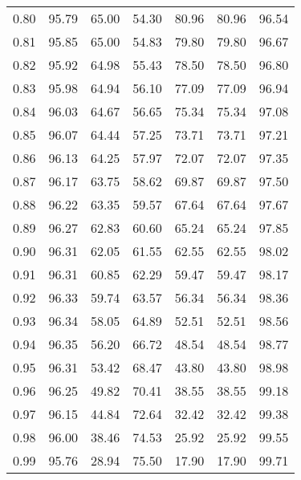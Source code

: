 \begin{tabular}{|c|c|c|c|c|c|c|}
      0.80 &     95.79 &     65.00 &      54.30 &   80.96 &      80.96 &         96.54 \\
      0.81 &     95.85 &     65.00 &      54.83 &   79.80 &      79.80 &         96.67 \\
      0.82 &     95.92 &     64.98 &      55.43 &   78.50 &      78.50 &         96.80 \\
      0.83 &     95.98 &     64.94 &      56.10 &   77.09 &      77.09 &         96.94 \\
      0.84 &     96.03 &     64.67 &      56.65 &   75.34 &      75.34 &         97.08 \\
      0.85 &     96.07 &     64.44 &      57.25 &   73.71 &      73.71 &         97.21 \\
      0.86 &     96.13 &     64.25 &      57.97 &   72.07 &      72.07 &         97.35 \\
      0.87 &     96.17 &     63.75 &      58.62 &   69.87 &      69.87 &         97.50 \\
      0.88 &     96.22 &     63.35 &      59.57 &   67.64 &      67.64 &         97.67 \\
      0.89 &     96.27 &     62.83 &      60.60 &   65.24 &      65.24 &         97.85 \\
      0.90 &     96.31 &     62.05 &      61.55 &   62.55 &      62.55 &         98.02 \\
      0.91 &     96.31 &     60.85 &      62.29 &   59.47 &      59.47 &         98.17 \\
      0.92 &     96.33 &     59.74 &      63.57 &   56.34 &      56.34 &         98.36 \\
      0.93 &     96.34 &     58.05 &      64.89 &   52.51 &      52.51 &         98.56 \\
      0.94 &     96.35 &     56.20 &      66.72 &   48.54 &      48.54 &         98.77 \\
      0.95 &     96.31 &     53.42 &      68.47 &   43.80 &      43.80 &         98.98 \\
      0.96 &     96.25 &     49.82 &      70.41 &   38.55 &      38.55 &         99.18 \\
      0.97 &     96.15 &     44.84 &      72.64 &   32.42 &      32.42 &         99.38 \\
      0.98 &     96.00 &     38.46 &      74.53 &   25.92 &      25.92 &         99.55 \\
      0.99 &     95.76 &     28.94 &      75.50 &   17.90 &      17.90 &         99.71 \\
\bottomrule
\end{tabular}
